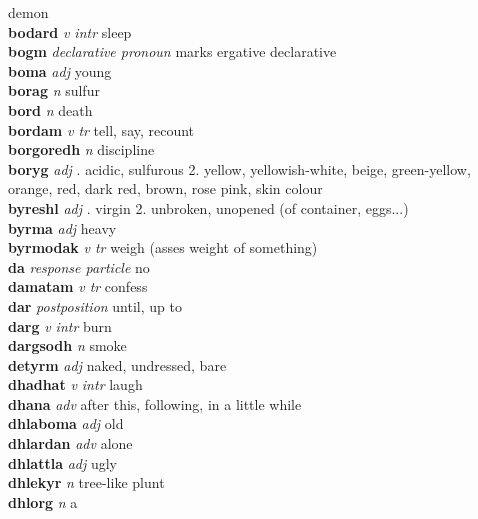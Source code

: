 demon\\\textbf{bodard}   \emph{v intr} \textperiodcentered sleep\\\textbf{bogm}   \emph{declarative pronoun} \textperiodcentered marks ergative declarative\\\textbf{boma}   \emph{adj} \textperiodcentered young\\\textbf{borag}   \emph{n} \textperiodcentered sulfur\\\textbf{bord}   \emph{n} \textperiodcentered death\\\textbf{bordam}   \emph{v tr} \textperiodcentered tell, say, recount\\\textbf{borgoredh}   \emph{n} \textperiodcentered discipline\\\textbf{boryg}   \emph{adj} . acidic, sulfurous 2. yellow, yellowish-white, beige, green-yellow, orange, red, dark red, brown, rose pink, skin colour \\\textbf{byreshl}   \emph{adj} . virgin 2. unbroken, unopened (of container, eggs...) \\\textbf{byrma}   \emph{adj} \textperiodcentered heavy\\\textbf{byrmodak}   \emph{v tr} \textperiodcentered weigh (asses weight of something)\\\textbf{da}   \emph{response particle} \textperiodcentered no\\\textbf{damatam}   \emph{v tr} \textperiodcentered confess\\\textbf{dar}   \emph{postposition} \textperiodcentered until, up to\\\textbf{darg}   \emph{v intr} \textperiodcentered burn\\\textbf{dargsodh}   \emph{n} \textperiodcentered smoke\\\textbf{detyrm}   \emph{adj} \textperiodcentered naked, undressed, bare\\\textbf{dhadhat}   \emph{v intr} \textperiodcentered laugh\\\textbf{dhana}   \emph{adv} \textperiodcentered after this, following, in a little while\\\textbf{dhlaboma}   \emph{adj} \textperiodcentered old\\\textbf{dhlardan}   \emph{adv} \textperiodcentered alone\\\textbf{dhlattla}   \emph{adj} \textperiodcentered ugly\\\textbf{dhlekyr}   \emph{n} \textperiodcentered tree-like plunt\\\textbf{dhlorg}   \emph{n} \textperiodcentered a 